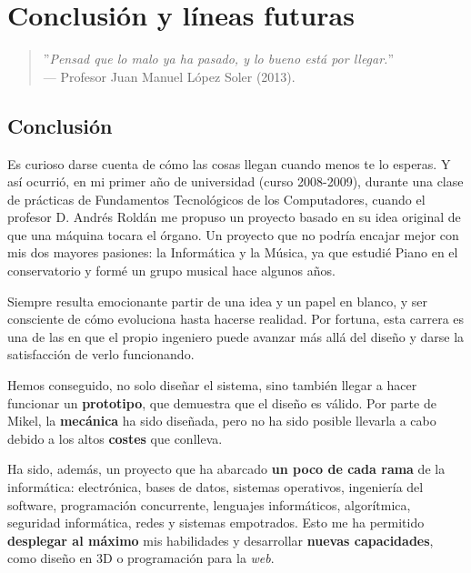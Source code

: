 \chapter{Conclusión y líneas futuras}
\label{cap:capitulo7}

\begin{quote}
	\begin{flushright}
		\small ''\textit{Pensad que lo malo ya ha pasado, y lo bueno está por llegar.}'' \\
		--- Profesor Juan Manuel López Soler (2013).
	\end{flushright}
\end{quote}

\newpage

\section{Conclusión}

Es curioso darse cuenta de cómo las cosas llegan cuando menos te lo esperas. Y así ocurrió, en mi primer año de universidad (curso 2008-2009), durante una clase de prácticas de Fundamentos Tecnológicos de los Computadores, cuando el profesor D. Andrés Roldán me propuso un proyecto basado en su idea original de que una máquina tocara el órgano. Un proyecto que no podría encajar mejor con mis dos mayores pasiones: la Informática y la Música, ya que estudié Piano en el conservatorio y formé un grupo musical hace algunos años.

Siempre resulta emocionante partir de una idea y un papel en blanco, y ser consciente de cómo evoluciona hasta hacerse realidad. Por fortuna, esta carrera es una de las en que el propio ingeniero puede avanzar más allá del diseño y darse la satisfacción de verlo funcionando.

Hemos conseguido, no solo diseñar el sistema, sino también llegar a hacer funcionar un \textbf{prototipo}, que demuestra que el diseño es válido. Por parte de Mikel, la \textbf{mecánica} ha sido diseñada, pero no ha sido posible llevarla a cabo debido a los altos \textbf{costes} que conlleva.

Ha sido, además, un proyecto que ha abarcado \textbf{un poco de cada rama} de la informática: electrónica, bases de datos, sistemas operativos, ingeniería del software, programación concurrente, lenguajes informáticos, algorítmica, seguridad informática, redes y sistemas empotrados. Esto me ha permitido \textbf{desplegar al máximo} mis habilidades y desarrollar \textbf{nuevas capacidades}, como diseño en 3D o programación para la \textit{web}.

